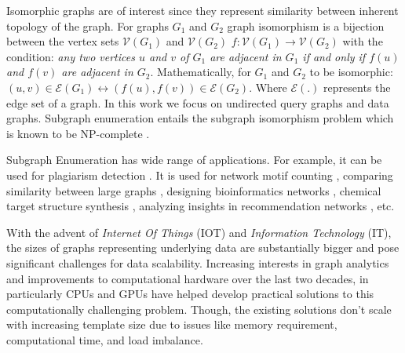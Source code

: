 Isomorphic graphs are of interest since they represent similarity between inherent topology of the graph.
For graphs $G_1$ and $G_2$ graph isomorphism is a bijection between the vertex sets $\mathcal{V}(G_1)$ and $\mathcal{V}(G_2)$ $f: \mathcal{V}(G_1) \rightarrow \mathcal{V}(G_2) $ with the condition: \textit{any two vertices $u$ and $v$ of $G_1$ are adjacent in $G_1$ \textit{if and only if} $f(u)$ and $f(v)$ are adjacent in $G_2$}.
Mathematically, for $G_1$ and $G_2$ to be isomorphic: $(u,v) \in \mathcal{E}(G_1) \leftrightarrow (f(u),f(v)) \in \mathcal{E}(G_2)$. Where $\mathcal{E}(.)$ represents the edge set of a graph. In this work we focus on undirected query graphs and data graphs.
Subgraph enumeration entails the subgraph isomorphism problem which is known to be NP-complete \cite{Book:Complexity_Theory}.

Subgraph Enumeration has wide range of applications.
For example, it can be used for plagiarism detection \cite{quasi-clique-plagiarism}.
It is used for network motif counting \cite{motif-counting-application}, comparing similarity between large graphs \cite{large-graph-comparison-application}, designing bioinformatics networks \cite{bioinformatics-application}, chemical target structure synthesis \cite{chemical-target-application}, analyzing insights in recommendation networks \cite{recommendation-network-application}, etc.

With the advent of \textit{Internet Of Things} (IOT) and \textit{Information Technology} (IT), the sizes of graphs representing underlying data are substantially bigger and pose
significant
challenges for data scalability.
Increasing interests in graph analytics and improvements to computational hardware over the last two decades, in particularly CPUs and GPUs have helped develop practical solutions to this computationally challenging problem.
Though, the existing solutions don't scale with increasing template size due to issues like memory requirement, computational time, and load imbalance.

